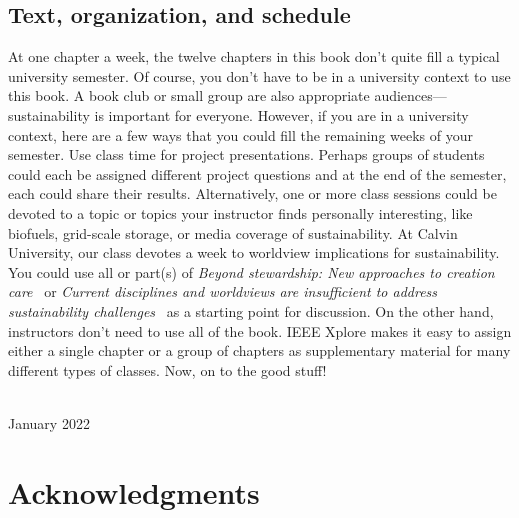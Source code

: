 {%
\section*{Text, organization, and schedule} 

At one chapter a week, the twelve chapters in this book don't quite fill a typical 
university semester. 
Of course, you don't have to be in a university context to use this book. 
A book club or small group are also appropriate audiences---sustainability 
is important for everyone. 
However, if you are in a university context, here are a few ways that you could fill the 
remaining weeks of your semester. 
Use class time for project presentations. 
Perhaps groups of students could each be assigned different project questions and 
at the end of the semester, each could share their results.
Alternatively, one or more class sessions could be devoted to a topic or topics 
your instructor finds personally interesting, like biofuels, grid-scale storage, 
or media coverage of sustainability. 
At Calvin University, our class devotes a week to worldview implications for 
sustainability. 
You could use all or part(s) of \emph{Beyond stewardship: New approaches to 
creation care}~\citep{Warners:2019aa}
or \emph{Current disciplines and worldviews are insufficient
to address sustainability challenges}~\cite{VanH2019} as a starting point for discussion. 
On the other hand, instructors don't need to use all of the book. 
IEEE Xplore makes it easy to assign either a single chapter or a group of chapters 
as supplementary material for many different types of classes.
Now, on to the good stuff!

\vspace*{2pc}
\noindent\AUTHORS\\
\noindent January 2022
}

\cleardoublepage




\chapter*{Acknowledgments}

